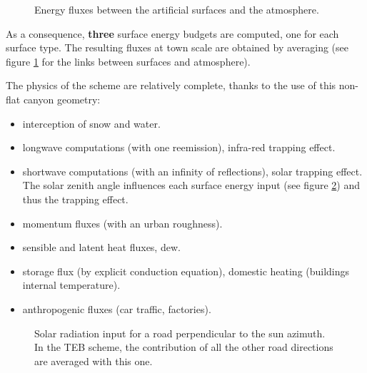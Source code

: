 \begin{figure}[t]
\hspace*{0.cm}
\caption{Energy fluxes between the artificial surfaces and the atmosphere.
\label{TEB3}}
\end{figure}

As a consequence, {\bf three} surface energy budgets are computed, one
for each surface type. The resulting fluxes at town scale are obtained
by averaging (see figure \ref{TEB3} for the links between surfaces and
atmosphere).

\clearpage
The physics of the scheme are relatively complete, thanks to
the use of this non-flat canyon geometry:
\begin{itemize}
\item interception of snow and water.
\item longwave computations (with one reemission), infra-red trapping effect.
\item shortwave computations (with an infinity of reflections),
solar trapping effect. The solar zenith angle influences
each surface energy input (see figure \ref{TEB4}) and thus the trapping effect.
\item momentum fluxes (with an urban roughness).
\item sensible and latent heat fluxes, dew.
\item storage flux (by explicit conduction equation),
domestic heating (buildings internal temperature).
\item anthropogenic fluxes (car traffic, factories).
\end{itemize}


\begin{figure}[t]
\hspace*{0.cm}
\caption{Solar radiation input for a road perpendicular to the sun azimuth.
In the TEB scheme, the contribution of all the other road directions
are averaged with this one.
\label{TEB4}}
\end{figure}

